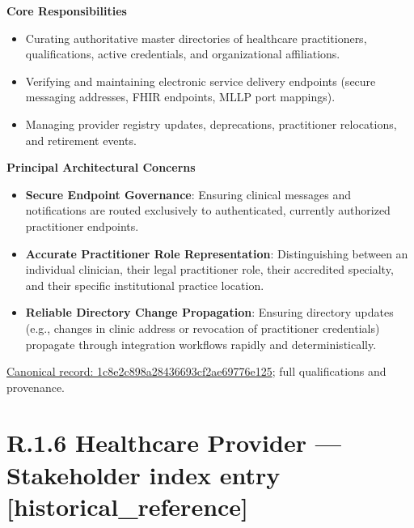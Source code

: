 \par\medskip\textbf{Core Responsibilities}\par


\begin{itemize}


\item Curating authoritative master directories of healthcare practitioners, qualifications, active credentials, and organizational affiliations.

\item Verifying and maintaining electronic service delivery endpoints (secure messaging addresses, FHIR endpoints, MLLP port mappings).

\item Managing provider registry updates, deprecations, practitioner relocations, and retirement events.

\end{itemize}


\par\medskip\textbf{Principal Architectural Concerns}\par


\begin{itemize}


\item \textbf{Secure Endpoint Governance}: Ensuring clinical messages and notifications are routed exclusively to authenticated, currently authorized practitioner endpoints.

\item \textbf{Accurate Practitioner Role Representation}: Distinguishing between an individual clinician, their legal practitioner role, their accredited specialty, and their specific institutional practice location.

\item \textbf{Reliable Directory Change Propagation}: Ensuring directory updates (e.g., changes in clinic address or revocation of practitioner credentials) propagate through integration workflows rapidly and deterministically.

\end{itemize}

{\footnotesize \href{../../../../../../../continuum/motivation/stakeholder/1c8e2c898a28436693cf2ae69776e125.md}{Canonical record: 1c8e2c898a28436693cf2ae69776e125}; full qualifications and provenance.}\par
\section*{R.1.6 Healthcare Provider — Stakeholder index entry [historical\_reference]}
\label{navigation:R.1.6}


